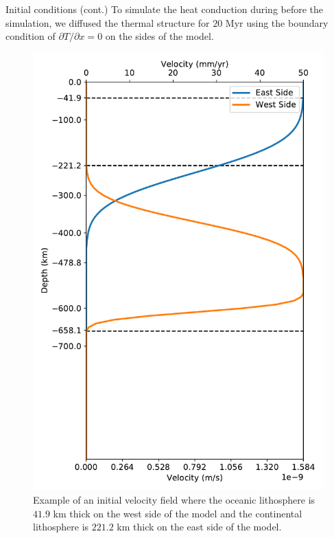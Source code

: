 \documentclass[final]{beamer}
\newlength{\colwidth}
\begin{document}
\begin{frame}[t]
\begin{columns}[t]
\begin{column}{\colwidth}
\begin{block}{Initial conditions (cont.)}
      To simulate the heat conduction during before the simulation, we diffused the thermal structure for $20$ Myr using the boundary condition of $\partial T/\partial x=0$ on the sides of the model.

    \heading{\textcolor{darkblue}{Velocity field}}

      \begin{figure}
        \centering
        \includegraphics[width=0.15\paperwidth]{figures/velocity_profile.pdf}
        \caption{Example of an initial velocity field where the oceanic lithosphere is $41.9$ km thick on the west side of the model and the continental lithosphere is $221.2$ km thick on the east side of the model.}
        \label{fig:velocity-profile}
      \end{figure}
        

\end{block}
\end{column}
\end{columns}
\end{frame}
\end{document}
